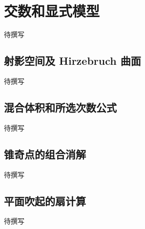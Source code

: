 
% 
% 

\section{交数和显式模型}
\label{g5:sec:2804}

待撰写

\subsection{射影空间及 Hirzebruch 曲面}
\label{g5:subsec:2804:01}
待撰写

\subsection{混合体积和所选次数公式}
\label{g5:subsec:2804:02}
待撰写

\subsection{锥奇点的组合消解}
\label{g5:subsec:2804:03}
待撰写

\subsection{平面吹起的扇计算}
\label{g5:subsec:2804:04}
待撰写
